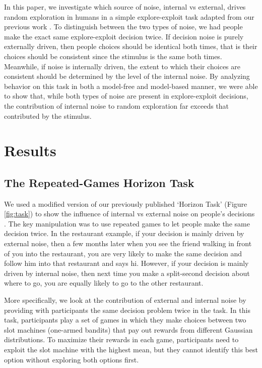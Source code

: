 \documentclass[12pt]{article}
\begin{document}
	In this paper, we investigate which source of noise, internal vs external, drives random exploration in humans in a simple explore-exploit task adapted from our previous work \cite{}. To distinguish between the two types of noise, we had people make the exact same explore-exploit decision twice. If decision noise is purely externally driven, then people choices should be identical both times, that is their choices should be consistent since the stimulus is the same both times. Meanwhile, if noise is internally driven, the extent to which their choices are consistent should be determined by the level of the internal noise. By analyzing behavior on this task in both a model-free and model-based manner, we were able to show that, while both types of noise are present in explore-exploit decisions, the contribution of internal noise to random exploration far exceeds that contributed by the stimulus.
	
	
	\section*{Results}
	
	\subsection*{The Repeated-Games Horizon Task}
	We used a modified version of our previously published `Horizon Task' (Figure \ref{fig:task}) to show the influence of internal vs external noise on people's decisions \cite{}. The key manipulation was to use repeated games to let people make the same decision twice. In the restaurant example, if your decision is mainly driven by external noise, then a few months later when you see the friend walking in front of you into the restaurant, you are very likely to make the same decision and follow him into that restaurant and says hi. However, if your decision is mainly driven by internal noise, then next time you make a split-second decision about where to go, you are equally likely to go to the other restaurant.
	
	More specifically, we look at the contribution of external and internal noise by providing with participants the same decision problem twice in the task. In this task, participants play a set of games in which they make choices between two slot machines (one-armed bandits) that pay out rewards from different Gaussian distributions. To maximize their rewards in each game, participants need to exploit the slot machine with the highest mean, but they cannot identify this best option without exploring both options first. 
	 
\end{document}
